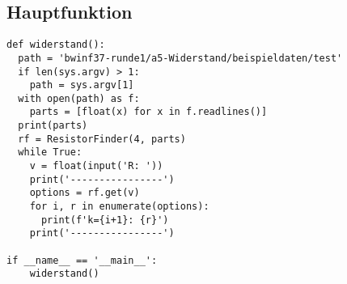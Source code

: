 \documentclass[a4paper,10pt,ngerman]{scrartcl}
\begin{document}
\subsection{Hauptfunktion}
\begin{lstlisting}[frame=single]
def widerstand():
  path = 'bwinf37-runde1/a5-Widerstand/beispieldaten/test'
  if len(sys.argv) > 1:
    path = sys.argv[1]
  with open(path) as f:
    parts = [float(x) for x in f.readlines()]
  print(parts)
  rf = ResistorFinder(4, parts)
  while True:
    v = float(input('R: '))
    print('----------------')
    options = rf.get(v)
    for i, r in enumerate(options):
      print(f'k={i+1}: {r}')
    print('----------------')

if __name__ == '__main__':
    widerstand()
 
\end{lstlisting}
\end{document}
